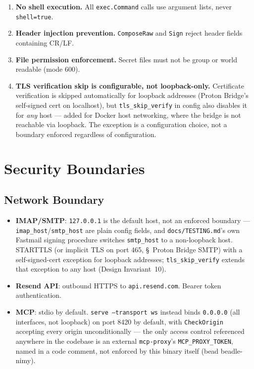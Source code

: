 \documentclass[a4paper,10pt,fleqn]{article}
\begin{document}
\begin{enumerate}
  \item \textbf{No shell execution.}  All \texttt{exec.Command}
    calls use argument lists, never \texttt{shell=true}.

  \item \textbf{Header injection prevention.}  \texttt{ComposeRaw}
    and \texttt{Sign} reject header fields containing CR/LF.

  \item \textbf{File permission enforcement.}  Secret files must
    not be group or world readable (mode 600).

  \item \textbf{TLS verification skip is configurable, not
    loopback-only.}  Certificate verification is skipped
    automatically for loopback addresses (Proton Bridge's self-signed
    cert on localhost), but \texttt{tls\_skip\_verify} in config also
    disables it for \emph{any} host --- added for Docker host
    networking, where the bridge is not reachable via loopback.  The
    exception is a configuration choice, not a boundary enforced
    regardless of configuration.
\end{enumerate}

\section{Security Boundaries}

\subsection{Network Boundary}

\begin{itemize}
  \item \textbf{IMAP/SMTP}: \texttt{127.0.0.1} is the default host,
    not an enforced boundary --- \texttt{imap\_host}/\texttt{smtp\_host}
    are plain config fields, and \texttt{docs/TESTING.md}'s own
    Fastmail signing procedure switches \texttt{smtp\_host} to a
    non-loopback host.  STARTTLS (or implicit TLS on port 465,
    \S~Proton Bridge SMTP) with a self-signed-cert exception for
    loopback addresses; \texttt{tls\_skip\_verify} extends that
    exception to any host (Design Invariant~10).
  \item \textbf{Resend API}: outbound HTTPS to
    \texttt{api.resend.com}.  Bearer token authentication.
  \item \textbf{MCP}: stdio by default.  \texttt{serve --transport ws}
    instead binds \texttt{0.0.0.0} (all interfaces, not loopback) on
    port 8420 by default, with \texttt{CheckOrigin} accepting every
    origin unconditionally --- the only access control referenced
    anywhere in the codebase is an external \texttt{mcp-proxy}'s
    \texttt{MCP\_PROXY\_TOKEN}, named in a code comment, not enforced
    by this binary itself (bead beadle-nimy).
\end{itemize}
\end{document}
